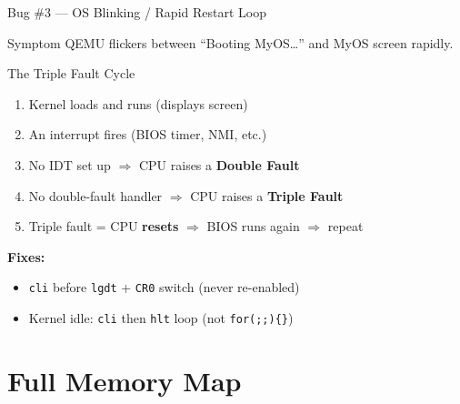 \documentclass[aspectratio=169]{beamer}
\newcommand{\concept}[2]{%
  \begin{block}{#1}\smallskip #2\smallskip\end{block}\vspace{5pt}}
\begin{document}
\begin{frame}{Bug \#3 --- OS Blinking / Rapid Restart Loop}
  \begin{alertblock}{Symptom}
    QEMU flickers between ``Booting MyOS\ldots'' and MyOS screen rapidly.
  \end{alertblock}
  \vspace{6pt}
  \concept{The Triple Fault Cycle}{
    \begin{enumerate}
      \item Kernel loads and runs (displays screen)
      \item An interrupt fires (BIOS timer, NMI, etc.)
      \item No IDT set up $\Rightarrow$ CPU raises a \textbf{Double Fault}
      \item No double-fault handler $\Rightarrow$ CPU raises a \textbf{Triple Fault}
      \item Triple fault = CPU \textbf{resets} $\Rightarrow$ BIOS runs again $\Rightarrow$ repeat
    \end{enumerate}
  }
  \vspace{4pt}
  \textbf{Fixes:}
  \begin{itemize}
    \item \texttt{cli} before \texttt{lgdt} + \texttt{CR0} switch (never re-enabled)
    \item Kernel idle: \texttt{cli} then \texttt{hlt} loop (not \texttt{for(;;)\{\}})
  \end{itemize}
\end{frame}

\section{Full Memory Map}
\end{document}
